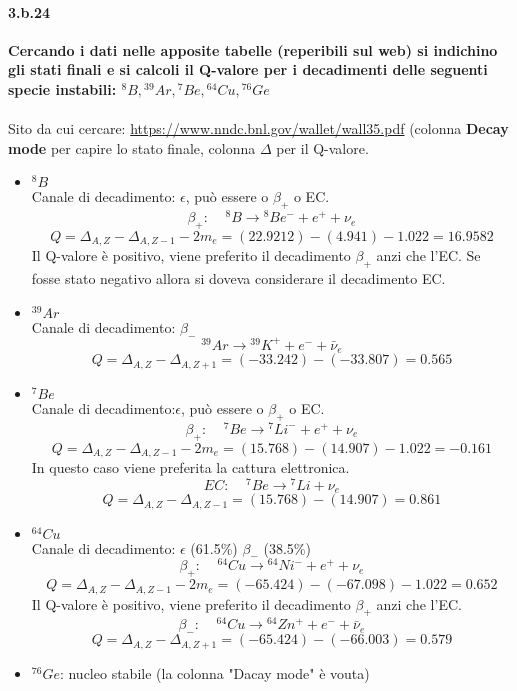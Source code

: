 \documentclass[twoside]{article}
\begin{document}
\paragraph{3.b.24}\textbf{Cercando i dati nelle apposite tabelle (reperibili sul web) si indichino gli stati finali e si calcoli il Q-valore per i decadimenti delle seguenti specie instabili: ${}^8B,{}^{39}Ar,{}^7Be, {}^{64}Cu,{}^{76}Ge$}\\
\\
Sito da cui cercare: \url{https://www.nndc.bnl.gov/wallet/wall35.pdf}
(colonna  \textbf{Decay mode} per capire lo stato finale, colonna $\Delta$ per il Q-valore.\\
\begin{itemize}

\item ${}^8B$\\
Canale di decadimento: $\epsilon$, può essere o $\beta_+$ o EC.\\
\[
\beta_+: \;\;\;\; {}^8B\rightarrow {}^8Be^-+e^++\nu_e
\]
\[
Q=\Delta_{A,Z}-\Delta_{A,Z-1}-2m_e=(22.9212)-(4.941)-1.022=16.9582
\]
Il Q-valore è positivo, viene preferito il decadimento $\beta_+$ anzi che l'EC. \warning Se fosse stato negativo allora si doveva considerare il decadimento EC.
\item ${}^{39}Ar$\\
Canale di decadimento: $\beta_-$
\[
{}^{39}Ar\rightarrow {}^{39}K^++e^-+\bar{\nu}_e
\]
\[
Q=\Delta_{A,Z}-\Delta_{A,Z+1}= (-33.242)-(-33.807)= 0.565
\]
\item ${}^7Be$\\
Canale di decadimento:$\epsilon$, può essere o $\beta_+$ o EC.\\
\[
\beta_+: \;\;\;\; {}^7Be\rightarrow {}^7Li^-+e^++\nu_e
\]
\[
Q=\Delta_{A,Z}-\Delta_{A,Z-1}-2m_e=(15.768)-(14.907)-1.022= -0.161
\]
In questo caso viene preferita la cattura elettronica.
\[
EC: \;\;\;\; {}^7Be\rightarrow {}^7Li+\nu_e
\]
\[
Q=\Delta_{A,Z}-\Delta_{A,Z-1}=(15.768)-(14.907)= 0.861
\]

\item ${}^{64}Cu$\\
Canale di decadimento: $\epsilon$ (61.5\%) $\beta_-$ (38.5\%)
\[
\beta_+: \;\;\;\; {}^{64}Cu \rightarrow {}^{64}Ni^-+e^++\nu_e
\]
\[
Q=\Delta_{A,Z}-\Delta_{A,Z-1}-2m_e=(-65.424)-(-67.098)-1.022=0.652
\]
Il Q-valore è positivo, viene preferito il decadimento $\beta_+$ anzi che l'EC.\\
\[
\beta_-:\;\;\;\; {}^{64}Cu\rightarrow {}^{64}Zn^++e^-+\bar{\nu}_e
\]
\[
Q=\Delta_{A,Z}-\Delta_{A,Z+1}=(-65.424) -(-66.003)= 0.579
\]

\item ${}^{76}Ge$: nucleo stabile (la colonna "Dacay mode" è vouta)

\end{itemize}
\end{document}
